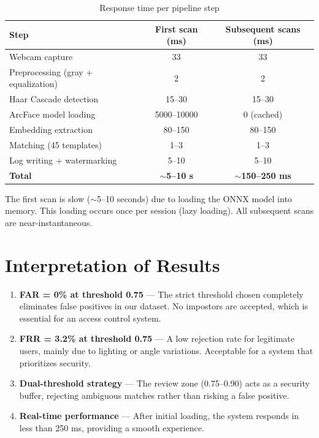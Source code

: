 \begin{table}[H]
    \centering
    \begin{tabular}{lcc}
        \toprule
        \textbf{Step} & \textbf{First scan (ms)} & \textbf{Subsequent scans (ms)} \\
        \midrule
        Webcam capture          & 33     & 33    \\
        Preprocessing (gray + equalization) & 2   & 2     \\
        Haar Cascade detection  & 15--30 & 15--30 \\
        ArcFace model loading   & 5000--10000 & 0 (cached) \\
        Embedding extraction    & 80--150 & 80--150 \\
        Matching (45 templates) & 1--3   & 1--3  \\
        Log writing + watermarking & 5--10  & 5--10 \\
        \midrule
        \textbf{Total}          & \textbf{$\sim$5--10 s} & \textbf{$\sim$150--250 ms} \\
        \bottomrule
    \end{tabular}
    \caption{Response time per pipeline step}
\end{table}

\begin{warnbox}
The first scan is slow ($\sim$5--10 seconds) due to loading the ONNX model into memory. This loading occurs once per session (lazy loading). All subsequent scans are near-instantaneous.
\end{warnbox}

\section{Interpretation of Results}

\begin{enumerate}
    \item \textbf{FAR = 0\% at threshold 0.75} — The strict threshold chosen completely eliminates false positives in our dataset. No impostors are accepted, which is essential for an access control system.

    \item \textbf{FRR = 3.2\% at threshold 0.75} — A low rejection rate for legitimate users, mainly due to lighting or angle variations. Acceptable for a system that prioritizes security.

    \item \textbf{Dual-threshold strategy} — The review zone (0.75--0.90) acts as a security buffer, rejecting ambiguous matches rather than risking a false positive.

    \item \textbf{Real-time performance} — After initial loading, the system responds in less than 250 ms, providing a smooth experience.
\end{enumerate}

